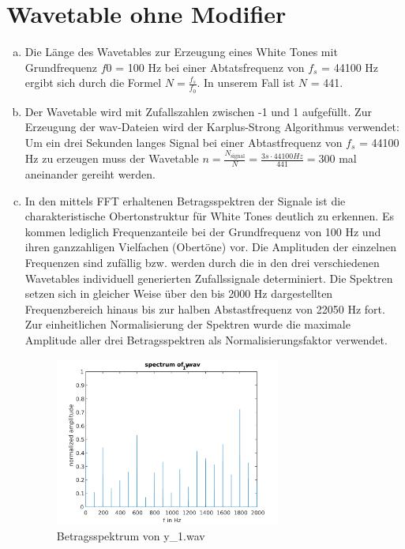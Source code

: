 \chapter{Wavetable ohne Modifier}

\begin{enumerate}[a)]
\item
Die Länge des Wavetables zur Erzeugung eines White Tones mit Grundfrequenz $f0$ = 100 Hz bei einer Abtatsfrequenz von $f_s$ = 44100 Hz ergibt sich durch die Formel $N = \frac{f_s} {f_0}$. In unserem Fall ist $N$ = 441.

\item
Der Wavetable wird mit Zufallszahlen zwischen -1 und 1 aufgefüllt. Zur Erzeugung der wav-Dateien wird der Karplus-Strong Algorithmus verwendet: Um ein drei Sekunden langes Signal bei einer Abtastfrequenz von $f_s$ = 44100 Hz zu erzeugen muss der Wavetable $n = \frac{N_{\mathrm{signal}}}{N} = \frac{3s \cdot 44100Hz}{441} = 300$ mal aneinander gereiht werden.

\item
In den mittels FFT erhaltenen Betragsspektren der Signale ist die charakteristische Obertonstruktur für White Tones deutlich zu erkennen.
Es kommen lediglich Frequenzanteile bei der Grundfrequenz von 100 Hz und ihren ganzzahligen Vielfachen (Obertöne) vor.
Die Amplituden der einzelnen Frequenzen sind zufällig bzw. werden durch die in den drei verschiedenen Wavetables individuell generierten Zufallssignale determiniert.
Die Spektren setzen sich in gleicher Weise über den bis 2000 Hz dargestellten Frequenzbereich hinaus bis zur halben Abstastfrequenz von 22050 Hz fort.
Zur einheitlichen Normalisierung der Spektren wurde die maximale Amplitude aller drei Betragsspektren als Normalisierungsfaktor verwendet.

\begin{figure}[H]
    \center
    \includegraphics[width = 0.7\textwidth]{Figures/spectrum1.pdf}
    \caption{Betragsspektrum von y\_1.wav}
    \label{fig:bs1}
\end{figure}



\end{enumerate}
